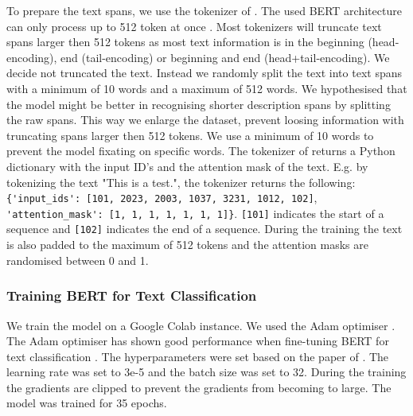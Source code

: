 \documentclass[a4paper, 12pt, oneside]{book} %
\begin{document}
To prepare the text spans, we use the tokenizer of \textcite{wolf_huggingfaces_2020}.
The used BERT architecture can only process up to 512 token at once \autocite{sanh_distilbert_2020, devlin_bert_2019}.
Most tokenizers will truncate text spans larger then 512 tokens as most text information is in the beginning (head-encoding), end (tail-encoding) or beginning and end (head+tail-encoding).
We decide not truncated the text.
Instead we randomly split the text into text spans with a minimum of 10 words and a maximum of 512 words.
We hypothesised that the model might be better in recognising shorter description spans by splitting the raw spans.  
This way we enlarge the dataset, prevent loosing information with truncating spans larger then 512 tokens. 
We use a minimum of 10 words to prevent the model fixating on specific words.
The tokenizer of \textcite{wolf_huggingfaces_2020} returns a Python dictionary with the input ID's and the attention mask of the text.
E.g. by tokenizing the text "This is a test.", the tokenizer returns the following:
\verb|{'input_ids': [101, 2023, 2003, 1037, 3231, 1012, 102]|, 
\verb|'attention_mask': [1, 1, 1, 1, 1, 1, 1]}|.
\verb|[101]| indicates the start of a sequence and \verb|[102]| indicates the end of a sequence.
During the training the text is also padded to the maximum of 512 tokens and the attention masks are randomised between 0 and 1.


\subsubsection{Training BERT for Text Classification}
We train the model on a Google Colab instance.
We used the Adam optimiser \autocite{kingma_adam_2017}.
The Adam optimiser has shown good performance when fine-tuning BERT for text classification \autocite{you_large_2020}.
The hyperparameters were set based on the paper of \textcite{sun_how_2020}.
The learning rate was set to 3e-5 and the batch size was set to 32.
During the training the gradients are clipped to prevent the gradients from becoming to large.
The model was trained for 35 epochs.
\end{document}
